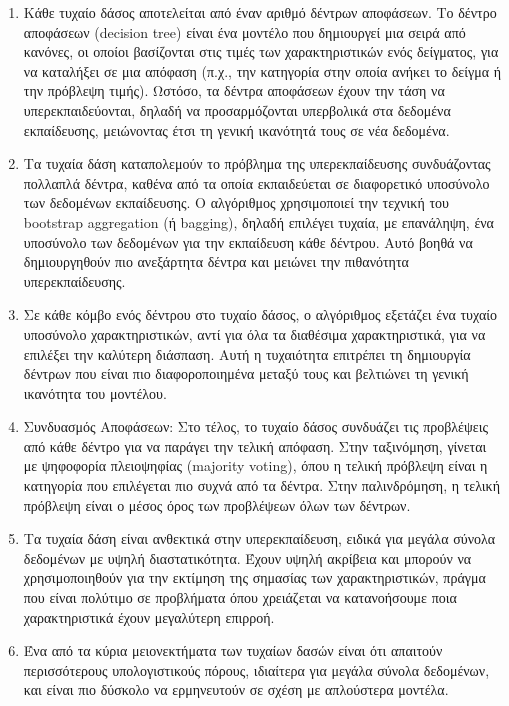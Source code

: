 \documentclass[diploma]{softlab-thesis}
\begin{document}
\begin{enumerate}
\item Κάθε τυχαίο δάσος αποτελείται από έναν αριθμό δέντρων αποφάσεων. Το δέντρο αποφάσεων (decision tree) είναι ένα μοντέλο που δημιουργεί μια σειρά από κανόνες, οι οποίοι βασίζονται στις τιμές των χαρακτηριστικών ενός δείγματος, για να καταλήξει σε μια απόφαση (π.χ., την κατηγορία στην οποία ανήκει το δείγμα ή την πρόβλεψη τιμής). Ωστόσο, τα δέντρα αποφάσεων έχουν την τάση να υπερεκπαιδεύονται, δηλαδή να προσαρμόζονται υπερβολικά στα δεδομένα εκπαίδευσης, μειώνοντας έτσι τη γενική ικανότητά τους σε νέα δεδομένα.
\item Τα τυχαία δάση καταπολεμούν το πρόβλημα της υπερεκπαίδευσης συνδυάζοντας πολλαπλά δέντρα, καθένα από τα οποία εκπαιδεύεται σε διαφορετικό υποσύνολο των δεδομένων εκπαίδευσης. Ο αλγόριθμος χρησιμοποιεί την τεχνική του bootstrap aggregation (ή bagging), δηλαδή επιλέγει τυχαία, με επανάληψη, ένα υποσύνολο των δεδομένων για την εκπαίδευση κάθε δέντρου. Αυτό βοηθά να δημιουργηθούν πιο ανεξάρτητα δέντρα και μειώνει την πιθανότητα υπερεκπαίδευσης.
\item Σε κάθε κόμβο ενός δέντρου στο τυχαίο δάσος, ο αλγόριθμος εξετάζει ένα τυχαίο υποσύνολο χαρακτηριστικών, αντί για όλα τα διαθέσιμα χαρακτηριστικά, για να επιλέξει την καλύτερη διάσπαση. Αυτή η τυχαιότητα επιτρέπει τη δημιουργία δέντρων που είναι πιο διαφοροποιημένα μεταξύ τους και βελτιώνει τη γενική ικανότητα του μοντέλου.
\item Συνδυασμός Αποφάσεων: Στο τέλος, το τυχαίο δάσος συνδυάζει τις προβλέψεις από κάθε δέντρο για να παράγει την τελική απόφαση. Στην ταξινόμηση, γίνεται με ψηφοφορία πλειοψηφίας (majority voting), όπου η τελική πρόβλεψη είναι η κατηγορία που επιλέγεται πιο συχνά από τα δέντρα. Στην παλινδρόμηση, η τελική πρόβλεψη είναι ο μέσος όρος των προβλέψεων όλων των δέντρων.
\item  Τα τυχαία δάση είναι ανθεκτικά στην υπερεκπαίδευση, ειδικά για μεγάλα σύνολα δεδομένων με υψηλή διαστατικότητα. Έχουν υψηλή ακρίβεια και μπορούν να χρησιμοποιηθούν για την εκτίμηση της σημασίας των χαρακτηριστικών, πράγμα που είναι πολύτιμο σε προβλήματα όπου χρειάζεται να κατανοήσουμε ποια χαρακτηριστικά έχουν μεγαλύτερη επιρροή.
\item Ένα από τα κύρια μειονεκτήματα των τυχαίων δασών είναι ότι απαιτούν περισσότερους υπολογιστικούς πόρους, ιδιαίτερα για μεγάλα σύνολα δεδομένων, και είναι πιο δύσκολο να ερμηνευτούν σε σχέση με απλούστερα μοντέλα.
\end{enumerate}
\end{document}
